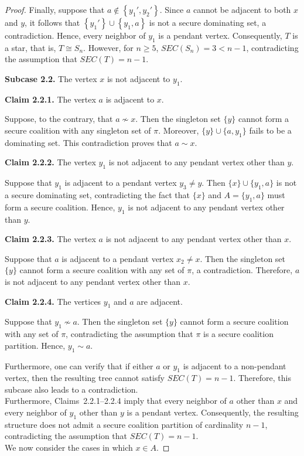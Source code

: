 \documentclass[10pt,a4paper]{amsart}
\begin{document}
\begin{proof}
Finally, suppose that $a\notin\left\{y_1',y_2'\right\}$. Since $a$ cannot be adjacent to both $x$ and $y$, it follows that
$\left\{y_1'\right\}\cup\left\{y_1,a\right\}$ is not a secure dominating set, a contradiction. Hence, every neighbor of $y_1$ is a pendant vertex. Consequently, $T$ is a star, that is,
$T\cong S_n$. However, for $n\ge 5$,
$SEC(S_n)=3<n-1$, contradicting the assumption that $SEC(T)=n-1$. 

\textbf{Subcase 2.2.} The vertex $x$ is not adjacent to $y_1$.

\textbf{Claim 2.2.1.} The vertex $a$ is adjacent to $x$.

Suppose, to the contrary, that $a\not\sim x$. Then the singleton set $\{y\}$ cannot form a secure coalition with any singleton set of $\pi$. Moreover, $\{y\}\cup\{a,y_1\}$
fails to be a dominating set. This contradiction proves that $a\sim x$.

\textbf{Claim 2.2.2.} The vertex $y_1$ is not adjacent to any pendant vertex other than $y$.

Suppose that $y_1$ is adjacent to a pendant vertex $y_3\neq y$. Then $\{x\}\cup\{y_1,a\}$
is not a secure dominating set, contradicting the fact that $\{x\}$ and $A=\{y_1,a\}$ must form a secure coalition. Hence, $y_1$ is not adjacent to any pendant vertex other than $y$.

\textbf{Claim 2.2.3.} The vertex $a$ is not adjacent to any pendant vertex other than $x$.

Suppose that $a$ is adjacent to a pendant vertex $x_2\neq x$. Then the singleton set $\{y\}$ cannot form a secure coalition with any set of $\pi$, a contradiction. Therefore, $a$ is not adjacent to any pendant vertex other than $x$.

\textbf{Claim 2.2.4.} The vertices $y_1$ and $a$ are adjacent.

Suppose that $y_1\not\sim a$. Then the singleton set $\{y\}$ cannot form a secure coalition with any set of $\pi$, contradicting the assumption that $\pi$ is a secure coalition partition. Hence, $y_1\sim a$.

Furthermore, one can verify that if either $a$ or $y_1$ is adjacent to a non-pendant vertex, then the resulting tree cannot satisfy $SEC(T)=n-1$. Therefore, this subcase also leads to a contradiction.\\
Furthermore, Claims~2.2.1--2.2.4 imply that every neighbor of $a$ other than $x$ and every neighbor of $y_1$ other than $y$ is a pendant vertex. Consequently, the resulting structure does not admit a secure coalition partition of cardinality $n-1$, contradicting the assumption that $SEC(T)=n-1$.\\[2mm]
We now consider the cases in which $x\in A$.


\end{proof}
\end{document}

